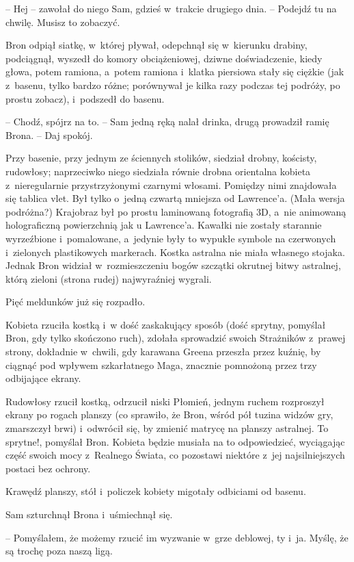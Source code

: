 \documentclass[oneside,polish,11pt,rmheadings]{mwbk}
\begin{document}
-- Hej -- zawołał do niego Sam, gdzieś w~trakcie drugiego dnia. -- Podejdź tu na chwilę. Musisz to zobaczyć. 

Bron odpiął siatkę, w~której pływał, odepchnął się w~kierunku drabiny, podciągnął, wyszedł do komory obciążeniowej, dziwne doświadczenie, kiedy głowa, potem ramiona, a~potem ramiona i~klatka piersiowa stały się ciężkie (jak z~basenu, tylko bardzo różne; porównywał je kilka razy podczas tej podróży, po prostu zobacz), i~podszedł do basenu. 

-- Chodź, spójrz na to. -- Sam jedną ręką nalał drinka, drugą prowadził ramię Brona. -- Daj spokój. 

Przy basenie, przy jednym ze ściennych stolików, siedział drobny, kościsty, rudowłosy; naprzeciwko niego siedziała równie drobna orientalna kobieta z~nieregularnie przystrzyżonymi czarnymi włosami. Pomiędzy nimi znajdowała się tablica vlet. Był tylko o~jedną czwartą mniejsza od Lawrence'a. (Mała wersja podróżna?) Krajobraz był po prostu laminowaną fotografią 3D, a~nie animowaną holograficzną powierzchnią jak u Lawrence'a. Kawałki nie zostały starannie wyrzeźbione i~pomalowane, a~jedynie były to wypukłe symbole na czerwonych i~zielonych plastikowych markerach. Kostka astralna nie miała własnego stojaka. Jednak Bron widział w~rozmieszczeniu bogów szczątki okrutnej bitwy astralnej, którą zieloni (strona rudej) najwyraźniej wygrali. 

Pięć meldunków już się rozpadło. 

Kobieta rzuciła kostką i~w dość zaskakujący sposób (dość sprytny, pomyślał Bron, gdy tylko skończono ruch), zdołała sprowadzić swoich Strażników z~prawej strony, dokładnie w~chwili, gdy karawana Greena przeszła przez kuźnię, by ciągnąć pod wpływem szkarłatnego Maga, znacznie pomnożoną przez trzy odbijające ekrany. 

Rudowłosy rzucił kostką, odrzucił niski Płomień, jednym ruchem rozproszył ekrany po rogach planszy (co sprawiło, że Bron, wśród pół tuzina widzów gry, zmarszczył brwi) i~odwrócił się, by zmienić matrycę na planszy astralnej. To sprytne!, pomyślał Bron. Kobieta będzie musiała na to odpowiedzieć, wyciągając część swoich mocy z~Realnego Świata, co pozostawi niektóre z~jej najsilniejszych postaci bez ochrony. 

Krawędź planszy, stół i~policzek kobiety migotały odbiciami od basenu. 

Sam szturchnął Brona i~uśmiechnął się. 

-- Pomyślałem, że możemy rzucić im wyzwanie w~grze deblowej, ty i~ja. Myślę, że są trochę poza naszą ligą. 
\end{document}
